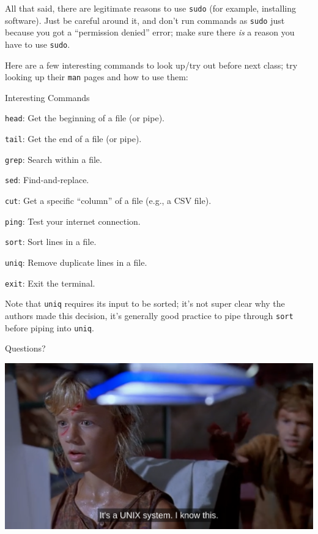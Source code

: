 All that said, there are legitimate reasons to use \texttt{sudo} (for example,
installing software).  Just be careful around it, and don't run commands as
\texttt{sudo} just because you got a \enquote{permission denied} error; make
sure there \textit{is} a reason you have to use \texttt{sudo}.

Here are a few interesting commands to look up/try out before next class; try
looking up their \texttt{man} pages and how to use them:

\begin{frame}{Interesting Commands}
  \begin{description}
    \item{\texttt{head}:} Get the beginning of a file (or pipe).
    \item{\texttt{tail}:} Get the end of a file (or pipe).
    \item{\texttt{grep}:} Search within a file.
    \item{\texttt{sed}:} Find-and-replace.
    \item{\texttt{cut}:} Get a specific \enquote{column} of a file (e.g., a CSV file).
    \item{\texttt{ping}:} Test your internet connection.
    \item{\texttt{sort}:} Sort lines in a file.
    \item{\texttt{uniq}:} Remove duplicate lines in a file.
    \item{\texttt{exit}:} Exit the terminal.
  \end{description}
\end{frame}

Note that \texttt{uniq} requires its input to be sorted; it's not super clear
why the authors made this decision, it's generally good practice to pipe
through \texttt{sort} before piping into \texttt{uniq}.

\begin{frame}{Questions?}
  \begin{center}
    \includegraphics[width=0.75\paperwidth]{images/unix-system.png}
  \end{center}
\end{frame}




